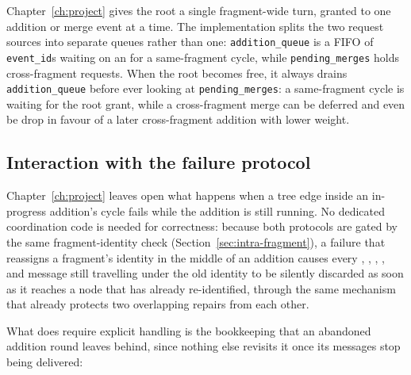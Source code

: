 Chapter~\ref{ch:project} gives the root a single fragment-wide turn, granted to one
addition or merge event at a time. The implementation splits the two request sources into
separate queues rather than one: \texttt{addition\_queue} is a FIFO of \texttt{event\_id}s
waiting on an  for a same-fragment cycle, while
\texttt{pending\_merges} holds cross-fragment  requests.
 When the root becomes free, it always drains
\texttt{addition\_queue} before ever looking at \texttt{pending\_merges}: a same-fragment
cycle is waiting for the root grant, while a cross-fragment merge can be deferred
and even be drop in favour of a later cross-fragment addition with lower weight.

\subsection{Interaction with the failure protocol}\label{sec:failure-addition}

Chapter~\ref{ch:project} leaves open what happens when a tree edge inside an in-progress
addition's cycle fails while the addition is still running. No dedicated coordination code
is needed for correctness: because both protocols are gated by the same fragment-identity
check (Section~\ref{sec:intra-fragment}), a failure that reassigns a fragment's identity
in the middle of an addition causes every , ,
, , and  message still travelling under the old
identity to be silently discarded as soon as it reaches a node that has already
re-identified, through the same mechanism that already protects two overlapping repairs
from each other.

What does require explicit handling is the bookkeeping that an abandoned addition round
leaves behind, since nothing else revisits it once its messages stop being delivered:

